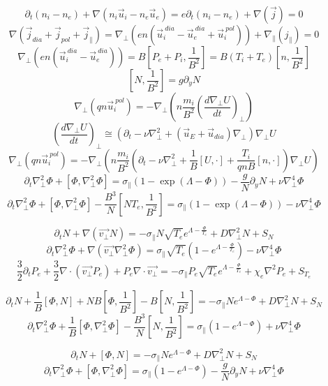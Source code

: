\documentclass[12pt]{article}
\begin{document}
$$\partial_t\left(n_i-n_e\right)+\nabla\left(n_i\vec{u}_i-n_e\vec{u}_e\right)=e\partial_t\left(n_i-n_e\right)+\nabla\left(\vec{j}\right)=0 $$
$$\nabla\left(\vec{j}_{dia}+\vec{j}_{pol}+\vec{j}_\parallel\right)=\nabla_\perp\left(en\left(\vec{u}^{~dia}_i-\vec{u}^{~dia}_e+\vec{u}^{~pol}_i\right)\right)+\nabla_\parallel\left(j_\parallel\right)=0$$
$$\nabla_\perp\left(en\left(\vec{u}^{~dia}_i-\vec{u}^{~dia}_e\right)\right)=B\left[P_e+P_i,\frac{1}{B^2}\right]=B\left(T_i+T_e\right)\left[n,\frac{1}{B^2}\right]$$
$$\left[N,\frac{1}{B^2}\right]=g\partial_yN$$
$$\nabla_\perp\left(qn\vec{u}^{~pol}_i\right)=-\nabla_\perp\left(n\frac{m_i}{B^2}\left(\frac{d\nabla_\perp U}{dt}\right)_\perp\right)$$
$$\left(\frac{d\nabla_\perp U}{dt}\right)_\perp\cong\left(\partial_t-\nu\nabla^2_\perp+\left(\vec{u}_E+\vec{u}_{dia}\right)\nabla_\perp\right)\nabla_\perp U $$
$$\nabla_\perp\left(qn\vec{u}^{~pol}_i\right)=-\nabla_\perp\left(n\frac{m_i}{B^2}\left(\partial_t-\nu\nabla^2_\perp+\frac{1}{B}\left[U,\cdot\right]+\frac{T_i}{qnB}\left[n,\cdot\right]\right)\nabla_\perp U\right) $$
$$\partial_t\nabla^2_\perp \Phi+\left[\Phi,\nabla^2_\perp \Phi\right]=\sigma_\parallel\left(1-\exp\left(\Lambda-\Phi\right)\right)-\frac{g}{N}\partial_yN+\nu\nabla^4_\perp \Phi$$
$$\partial_t\nabla^2_\perp \Phi+\left[\Phi,\nabla^2_\perp \Phi\right]-\frac{B^3}{N}\left[NT_e,\frac{1}{B^2}\right]=\sigma_\parallel\left(1-\exp\left(\Lambda-\Phi\right)\right)-\nu\nabla^4_\perp \Phi$$


$$\partial_tN+\nabla\left(\vec{v_\perp}N\right)=-\sigma_\parallel N\sqrt{T_e} e^{\Lambda-\frac{\Phi}{T_e}}+D\nabla^2_\perp N +S_N$$
$$\partial_t\nabla^2_\perp \Phi+\nabla\left(\vec{v_\perp}\nabla^2_\perp \Phi\right)=\sigma_\parallel \sqrt{T_e}\left(1-e^{\Lambda-\frac{\Phi}{T_e}}\right)-\nu\nabla^4_\perp \Phi$$
$$\frac{3}{2}\partial_tP_e+\frac{3}{2}\nabla\cdot\left(\vec{v_\perp}P_e\right)+P_e\nabla\cdot\vec{v_\perp}=-\sigma_\parallel P_e\sqrt{T_e} e^{\Lambda-\frac{\Phi}{T_e}}+\chi_e\nabla^2P_e+S_{T_e}$$


$$\partial_tN+\frac{1}{B}\left[\Phi,N\right]+NB\left[\Phi,\frac{1}{B^2}\right]-B\left[N,\frac{1}{B^2}\right]=-\sigma_\parallel N e^{\Lambda-\Phi}+D\nabla^2_\perp N+S_N$$
$$\partial_t\nabla^2_\perp \Phi+\frac{1}{B}\left[\Phi,\nabla^2_\perp \Phi\right]-\frac{B^3}{N}\left[N,\frac{1}{B^2}\right]=\sigma_\parallel\left(1-e^{\Lambda-\Phi}\right)+\nu\nabla^4_\perp \Phi$$

$$\partial_tN+\left[\Phi,N\right]=-\sigma_\parallel N e^{\Lambda-\Phi}+D\nabla^2_\perp N +S_N$$
$$\partial_t\nabla^2_\perp \Phi+\left[\Phi,\nabla^2_\perp \Phi\right]=\sigma_\parallel\left(1-e^{\Lambda-\Phi}\right)-\frac{g}{N}\partial_yN+\nu\nabla^4_\perp \Phi$$
\end{document}
